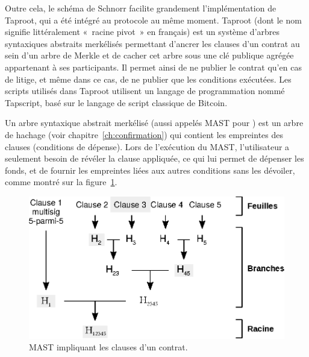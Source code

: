 Outre cela, le schéma de Schnorr facilite grandement l'implémentation de Taproot, qui a été intégré au protocole au même moment. Taproot (dont le nom signifie littéralement «~racine pivot~» en français) est un système d'arbres syntaxiques abstraits merkélisés permettant d'ancrer les clauses d'un contrat au sein d'un arbre de Merkle et de cacher cet arbre sous une clé publique agrégée appartenant à ses participants. Il permet ainsi de ne publier le contrat qu'en cas de litige, et même dans ce cas, de ne publier que les conditions exécutées. Les scripts utilisés dans Taproot utilisent un langage de programmation nommé Tapscript, basé sur le langage de script classique de Bitcoin.

Un arbre syntaxique abstrait merkélisé (aussi appelés MAST pour ) est un arbre de hachage (voir chapitre~\ref{ch:confirmation}) qui contient les empreintes des clauses (conditions de dépense). Lors de l'exécution du MAST, l'utilisateur a seulement besoin de révéler la clause appliquée, ce qui lui permet de dépenser les fonds, et de fournir les empreintes liées aux autres conditions sans les dévoiler, comme montré sur la figure~\ref{fig:taproot-mast}.

\begin{figure}[h]
  \centering
  \includegraphics[scale=0.75]{img/taproot-mast.eps}
  \caption{MAST impliquant les clauses d'un contrat.}
  \label{fig:taproot-mast}
\end{figure}

